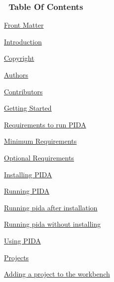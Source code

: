 \documentclass[10pt,a4paper,english]{article}
\begin{document}
\subsubsection*{~\hfill Table Of Contents\hfill ~}
\begin{list}{}{}
\item {} \href{\#front-matter}{Front Matter}
\begin{list}{}{}
\item {} \href{\#introduction}{Introduction}

\item {} \href{\#copyright}{Copyright}

\item {} \href{\#authors}{Authors}

\item {} \href{\#contributors}{Contributors}

\end{list}

\item {} \href{\#getting-started}{Getting Started}
\begin{list}{}{}
\item {} \href{\#requirements-to-run-pida}{Requirements to run PIDA}
\begin{list}{}{}
\item {} \href{\#minimum-requirements}{Minimum Requirements}

\item {} \href{\#optional-requirements}{Optional Requirements}

\end{list}

\item {} \href{\#installing-pida}{Installing PIDA}

\item {} \href{\#running-pida}{Running PIDA}
\begin{list}{}{}
\item {} \href{\#running-pida-after-installation}{Running pida after installation}

\item {} \href{\#running-pida-without-installing}{Running pida without installing}

\end{list}

\end{list}

\item {} \href{\#using-pida}{Using PIDA}
\begin{list}{}{}
\item {} \href{\#projects}{Projects}
\begin{list}{}{}
\item {} \href{\#adding-a-project-to-the-workbench}{Adding a project to the workbench}


\end{list}
\end{list}
\end{list}
\end{document}
